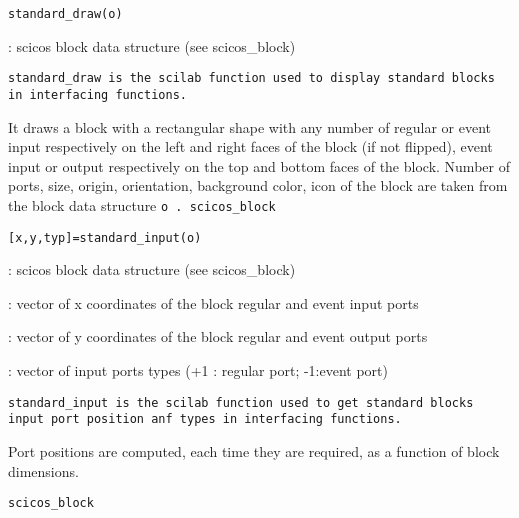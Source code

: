 \begin{verbatim}
standard_draw(o)
\end{verbatim}
\begin{scitem}
\item[{\verb?o?}]
: scicos block data structure (see scicos\_block)
\end{scitem}%
%
\tt standard\_draw %
\rm is the scilab function used to display
standard blocks in interfacing functions. 
\par\noindent
It draws a block with a rectangular shape with any number of regular
or event input respectively on the left and right faces of the block
(if not flipped), event input or output respectively on the top and
bottom faces of the block. Number of ports, size, origin, orientation,
background color, icon of the block are taken from the block data
structure %
\tt o%
\rm .
{\verb?scicos_block?} \pageref{scicosblock}
%
%


\label{standardinput}

\begin{verbatim}
[x,y,typ]=standard_input(o)
\end{verbatim}
\begin{scitem}
\item[{\verb?o?}]
: scicos block data structure (see scicos\_block)
\item[{\verb?x?}]
: vector of x coordinates of the block regular and event input ports
\item[{\verb?y?}]
: vector of y coordinates of the block regular and event output ports
\item[{\verb?typ?}]
: vector of input ports types (+1 : regular port; -1:event port)

\end{scitem}%
%
\tt standard\_input %
\rm is the scilab function used to get
standard blocks input port position anf types in interfacing
functions. 
\par\noindent
Port positions are computed, each time they are required, as a
function of block dimensions.

{\verb?scicos_block?} \pageref{scicosblock}
%
%



